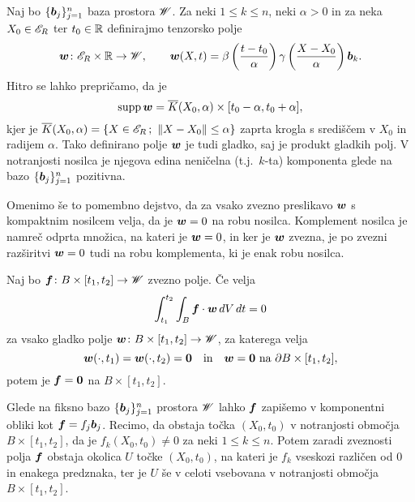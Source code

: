 Naj bo $\{\boldsymbol b_j\}_{j=1}^{n}$ baza prostora $\mathscr W$. Za neki $1\leq k\leq n$, neki $\alpha>0$ in
za neka $X_0\in\mathscr E_R$ ter $t_0\in\mathbb R$ definirajmo tenzorsko polje
\begin{equation} \label{e:funiw}
	\boldsymbol w\colon\mathscr E_R\times\mathbb R\to\mathscr W,\qquad\boldsymbol w(X,t)=\beta\left(\frac{t-t_0}{\alpha}\right)
	\gamma\left(\frac{X-X_0}{\alpha}\right)\boldsymbol b_k.
\end{equation}
Hitro se lahko prepričamo, da je
\begin{equation} \label{e:supaw}
	\mathrm{supp}\,\boldsymbol w=\overline{K}(X_0,\alpha)\times[t_0-\alpha,t_0+\alpha],
\end{equation}
kjer je $\overline{K}(X_0,\alpha)=\{X\in\E_R\,;\ \|X-X_0\|\leq\alpha\}$ zaprta krogla
s središčem v $X_0$ in radijem $\alpha$. Tako definirano polje $\boldsymbol w$ je
tudi gladko, saj je produkt gladkih polj. V notranjosti nosilca je njegova 
edina neničelna (t.j.~$k$-ta) komponenta glede na bazo $\{\boldsymbol b_j\}_{j=1}^{n}$ pozitivna.

Omenimo še to pomembno dejstvo, da za vsako zvezno preslikavo $\boldsymbol w$ s kompaktnim
nosilcem velja, da je $\boldsymbol w={0}$ na robu nosilca. Komplement nosilca je namreč odprta množica, na kateri
je $\boldsymbol w={0}$, in ker je $\boldsymbol w$ zvezna, je po zvezni razširitvi $\boldsymbol w={0}$ tudi na robu komplementa,
ki je enak robu nosilca.

\begin{lema}\label{l:1}
	Naj bo $\boldsymbol f\colon B\times [t_1,t_2]\to\mathscr W$ zvezno polje. Če velja
	\begin{equation}\label{e:lem1}
		\int_{t_1}^{t_2}\int_B\boldsymbol f\cdot\boldsymbol w\,dV\,dt = 0
	\end{equation}
	za vsako gladko polje $\boldsymbol w\colon B\times[t_1,t_2]\to\mathscr W$, za katerega velja
	\[
		\boldsymbol w(\cdot,t_1)=\boldsymbol w(\cdot,t_2)=\boldsymbol 0\quad\textrm{in}
		\quad\boldsymbol w=\boldsymbol 0\ \textrm{na}\ \partial B\times[t_1,t_2],
	\]
	potem je $\boldsymbol f=\boldsymbol 0$ na $B\times [t_1,t_2]$.
\end{lema}

\proof
	Glede na fiksno bazo $\{\boldsymbol b_j\}_{j=1}^n$ prostora $\mathscr W$ lahko $\boldsymbol f$
	zapišemo v komponentni obliki kot $\boldsymbol f=f_j\boldsymbol b_j$.
	Recimo, da obstaja točka $(X_0,t_0)$ v notranjosti območja $B\times[t_1,t_2]$, da je $f_{k}(X_0,t_0)\neq 0$
	za neki $1\leq k\leq n$. Potem zaradi zveznosti polja $\boldsymbol f$
	obstaja okolica $U$ točke $(X_0,t_0)$, na kateri je $f_k$
	vseskozi različen od 0 in enakega predznaka, ter
	je $U$ še v celoti vsebovana v notranjosti območja $B\times[t_1,t_2]$.
	

